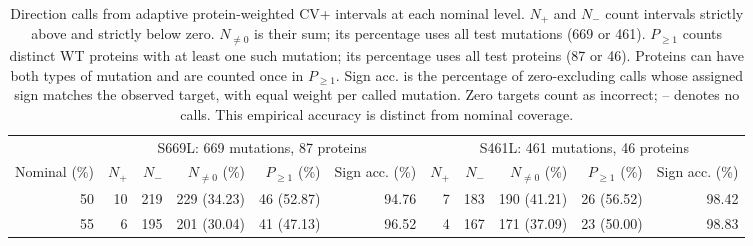\begin{table}
\centering
\caption{Direction calls from adaptive protein-weighted CV+ intervals at each nominal level. $N_+$ and $N_-$ count intervals strictly above and strictly below zero. $N_{\ne0}$ is their sum; its percentage uses all test mutations (669 or 461). $P_{\ge1}$ counts distinct WT proteins with at least one such mutation; its percentage uses all test proteins (87 or 46). Proteins can have both types of mutation and are counted once in $P_{\ge1}$. Sign acc. is the percentage of zero-excluding calls whose assigned sign matches the observed target, with equal weight per called mutation. Zero targets count as incorrect; -- denotes no calls. This empirical accuracy is distinct from nominal coverage.}
\label{tab:zero_exclusion}
\small
\setlength{\tabcolsep}{3pt}
\renewcommand{\arraystretch}{1.04}
\begin{tabular}{r rrrrr rrrrr}
\toprule
& \multicolumn{5}{c}{S669L: 669 mutations, 87 proteins} & \multicolumn{5}{c}{S461L: 461 mutations, 46 proteins}\\
\cmidrule(lr){2-6}\cmidrule(lr){7-11}
Nominal (\%) & $N_+$ & $N_-$ & $N_{\ne0}$ (\%) & $P_{\ge1}$ (\%) & Sign acc. (\%) & $N_+$ & $N_-$ & $N_{\ne0}$ (\%) & $P_{\ge1}$ (\%) & Sign acc. (\%)\\
\midrule
50 & 10 & 219 & 229 (34.23) & 46 (52.87) & 94.76 & 7 & 183 & 190 (41.21) & 26 (56.52) & 98.42\\
55 & 6 & 195 & 201 (30.04) & 41 (47.13) & 96.52 & 4 & 167 & 171 (37.09) & 23 (50.00) & 98.83\\

\end{tabular}
\end{table}
